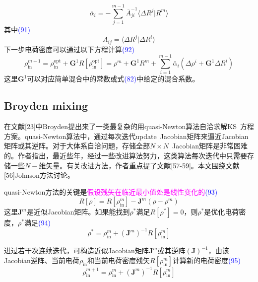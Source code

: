 \documentclass[14pt]{article}      %
\begin{document}
\begin{displaymath}
	\bar{\alpha}_i=-\sum_{j=1}^{m-1}\bar{A}_{ji}^{-1}\langle\Delta R^j|R^m\rangle
\end{displaymath}
其中\textcolor{blue}{(91)}
\begin{displaymath}
	\bar{A}_{ij}=\langle\Delta R^j|\Delta R^i\rangle
\end{displaymath}
下一步电荷密度可以通过以下方程计算\textcolor{blue}{(92)}
\begin{displaymath}
	\rho_{\mathrm{in}}^{m+1}=\rho_{\mathrm{in}}^{\mathrm{opt}}+\mathbf{G}^1R[\rho_{\mathrm{in}}^{\mathrm{opt}}]=\rho^m+\mathbf{G}^1R^m+\sum_{i=1}^{m-1}\bar{\alpha}_i(\Delta\rho^i+\mathbf{G}^1\Delta R^i)
\end{displaymath}
这里$\mathbf{G}^1$可以对应简单混合中的常数或式\textcolor{blue}{(82)}中给定的混合系数。

\subsection{Broyden mixing}
在文献[23]中\textrm{Broyden}提出来了一类最复杂的用\textrm{quasi-Newton}算法自洽求解\textrm{KS~}方程方案。\textrm{quasi-Newton}算法中，通过每次迭代\textrm{update}~\textrm{Jacobian}矩阵来逼近\textrm{Jacobian}矩阵或其逆阵。对于大体系自洽问题，存储全部$N\times N$~\textrm{Jacobian}矩阵是非常困难的。作者指出，最近些年，经过一些改进算法努力，这类算法每次迭代中只需要存储一些$N-$维矢量。有关改进方法，作者重点提了文献[57-59]。本文围绕文献[56]\textrm{Johnson}方法讨论。

\textrm{quasi-Newton}方法的关键是\textcolor{magenta}{假设残矢在临近最小值处是线性变化的}\textcolor{blue}{(93)}
\begin{displaymath}
	R[\rho]=R[\rho_{\mathrm{in}}^m]-\mathbf{J}^m(\rho-\rho^m)
\end{displaymath}
这里$\mathbf{J}^m$是近似\textrm{Jacobian}矩阵。如果能找到$\rho^{\ast}$满足$R[\rho^{\ast}]=0$，则$\rho^{\ast}$是优化电荷密度，$\rho^{\ast}$满足\textcolor{blue}{(94)}
\begin{displaymath}
	\rho^{\ast}=\rho_{\mathrm{in}}^m+(\mathbf{J}^m)^{-1}R[\rho_{\mathrm{in}}^m]
\end{displaymath}

进过若干次连续迭代，可构造近似\textrm{Jacobian}矩阵$\mathbf{J}^m$或其逆阵$(\mathbf{J})^{-1}$，由该\textrm{Jacobian}逆阵、当前电荷$\rho_{\mathrm{in}}$和当前电荷密度残矢$R[\rho_{\mathrm{in}}^m]$计算新的电荷密度\textcolor{blue}{(95)}
\begin{displaymath}
	\rho_{\mathrm{in}}^{m+1}=\rho_{\mathrm{in}}^{m}+(\mathbf{J}^m)^{-1}R[\rho_{\mathrm{in}}^{m}]
\end{displaymath}
\end{document}
